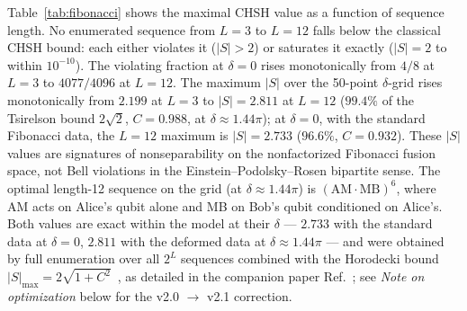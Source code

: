 \documentclass[aps,pra,twocolumn,superscriptaddress,showpacs,floatfix]{revtex4-2}
\begin{document}
Table~\ref{tab:fibonacci} shows the maximal CHSH value as a function of
sequence length. No enumerated sequence from $L=3$ to $L=12$ falls
below the classical CHSH bound: each either violates it ($|S|>2$) or
saturates it exactly ($|S|=2$ to within $10^{-10}$). The violating fraction at
$\delta = 0$ rises monotonically from $4/8$ at $L=3$ to $4077/4096$ at $L=12$. The
maximum $|S|$ over the 50-point $\delta$-grid rises monotonically from $2.199$
at $L=3$ to $|S|=2.811$ at $L=12$ ($99.4\%$ of the Tsirelson bound
$2\sqrt{2}$, $C=0.988$, at $\delta \approx 1.44\pi$); at $\delta = 0$, with
the standard Fibonacci data, the $L=12$ maximum is $|S| = 2.733$ ($96.6\%$, $C
= 0.932$).
These $|S|$ values are signatures of nonseparability on the nonfactorized
Fibonacci fusion space, not Bell violations in the
Einstein--Podolsky--Rosen bipartite sense.
The optimal length-12 sequence on the grid (at $\delta \approx 1.44\pi$) is
$(\text{AM}\cdot\text{MB})^6$, where AM acts on Alice's qubit alone and MB on
Bob's qubit conditioned on Alice's.
Both values are exact within the model at their $\delta$
--- $2.733$ with the standard data at $\delta=0$, $2.811$ with the deformed
data at $\delta\approx1.44\pi$ --- and were obtained by full enumeration
over all $2^L$ sequences combined
with the Horodecki bound $|S|_{\max} = 2\sqrt{1+C^2}$~\cite{Horodecki1995}, as
detailed in the companion paper Ref.~\cite{Sayim2026fibonacci}; see
\textit{Note on optimization} below for the v2.0 $\to$ v2.1 correction.
\end{document}
